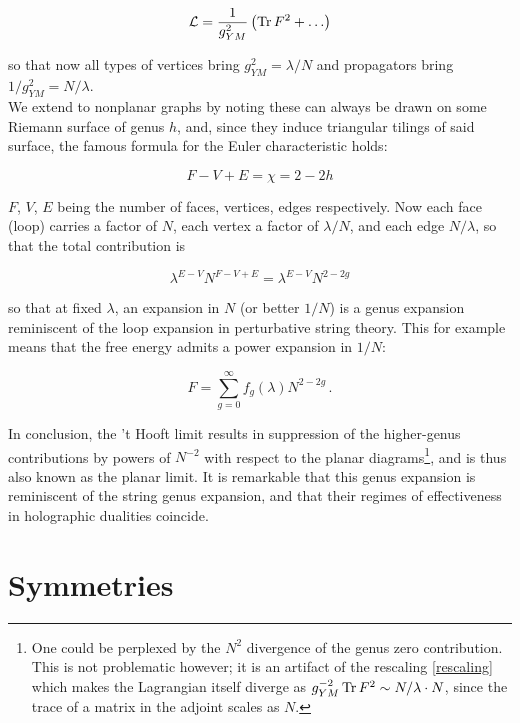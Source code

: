 \begin{equation} \label{rescaling} \mathcal{L} = \frac{1}{g_{YM}^2} \left( \operatorname{Tr} F^2 + \ldots \right) \end{equation}

so that now all types of vertices bring $g_{YM}^2 = \lambda/N$ and propagators bring $1/g_{YM}^2 = N/\lambda$.\\

We extend to nonplanar graphs by noting these can always be drawn on some Riemann surface of genus $h$, and, since they induce triangular tilings of said surface, the famous formula for the Euler characteristic holds:

\begin{equation}
F - V + E = \chi = 2 - 2h 
\end{equation}

$F$, $V$, $E$ being the number of faces, vertices, edges respectively. Now each face (loop) carries a factor of $N$, each vertex a factor of $\lambda/N$, and each edge $N/\lambda$, so that the total contribution is

\begin{equation}
\lambda^{E-V} N^{F-V+E} = \lambda^{E-V} N^{2-2g} 
\end{equation}

so that at fixed $\lambda$, an expansion in $N$ (or better $1/N$) is a genus expansion reminiscent of the loop expansion in perturbative string theory. This for example means that the free energy admits a power expansion in $1/N$:

\begin{equation}
F = \sum_{g=0}^\infty f_g(\lambda) N^{2-2g}\,.
\end{equation}

In conclusion, the 't Hooft limit results in suppression of the higher-genus contributions by powers of $N^{-2}$ with respect to the planar diagrams\footnote{One could be perplexed by the $N^2$ divergence of the genus zero contribution. This is not problematic however; it is an artifact of the rescaling \ref{rescaling} which makes the Lagrangian itself diverge as $g_{YM}^{-2} \operatorname{Tr} F^2 \sim N/\lambda \cdot N$, since the trace of a matrix in the adjoint scales as $N$.}, and is thus also known as the planar limit. It is remarkable that this genus expansion is reminiscent of the string genus expansion, and that their regimes of effectiveness in holographic dualities coincide.

\section{Symmetries}


